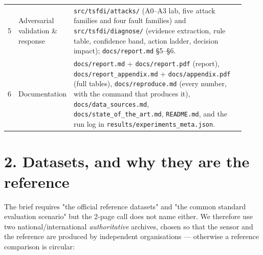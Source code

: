\documentclass[10pt,a4paper]{article}
\begin{document}
{\begin{longtable}{l>{\raggedright\arraybackslash}p{0.097\linewidth}>{\raggedright\arraybackslash}p{0.828\linewidth}}
5 & Adversarial validation \& response & \texttt{src/\allowbreak{}tsfdi/\allowbreak{}attacks/\allowbreak{}} (A0–A3 lab, five attack families and four fault families) and \texttt{src/\allowbreak{}tsfdi/\allowbreak{}diagnose/\allowbreak{}} (evidence extraction, rule table, confidence band, action ladder, decision impact); \texttt{docs/\allowbreak{}report.md} §5–§6. \\
6 & Documentation & \texttt{docs/\allowbreak{}report.md} + \texttt{docs/\allowbreak{}report.pdf} (report), \texttt{docs/\allowbreak{}report\_\allowbreak{}appendix.md} + \texttt{docs/\allowbreak{}appendix.pdf} (full tables), \texttt{docs/\allowbreak{}reproduce.md} (every number, with the command that produces it), \texttt{docs/\allowbreak{}data\_\allowbreak{}sources.md}, \texttt{docs/\allowbreak{}state\_\allowbreak{}of\_\allowbreak{}the\_\allowbreak{}art.md}, \texttt{README.md}, and the run log in \texttt{results/\allowbreak{}experiments\_\allowbreak{}meta.json}. \\
\end{longtable}
}

\section*{2. Datasets, and why they are the reference}
The brief requires "the official reference datasets" and "the common standard evaluation scenario" but the 2-\allowbreak{}page call does not name either. We therefore use two national/\allowbreak{}international \emph{authoritative} archives, chosen so that the sensor and the reference are produced by independent organisations — otherwise a reference comparison is circular:

\begin{center}
\end{center}
\end{document}
